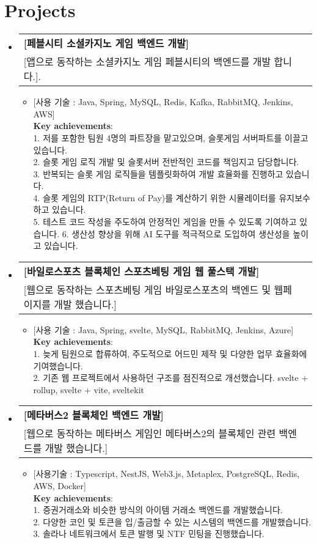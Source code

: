 \documentclass[letterpaper,11pt]{article}
\makeatletter
\newcommand{\resumeItem}[1]{
  \item\small{
    {#1 \vspace{-2pt}}
  }
}
\newcommand{\resumeProject}[2]{
  \vspace{-1pt}\item
    \begin{tabular*}{0.97\textwidth}[t]{l@{\extracolsep{\fill}}r}
      \textbf{#1} \\
      \small{#2} \\
    \end{tabular*}\vspace{-5pt}
}
\newcommand{\resumeSubHeadingListStart}{\begin{itemize}[leftmargin=*]}
\newcommand{\resumeSubHeadingListEnd}{\end{itemize}}
\newcommand{\resumeItemListStart}{\begin{itemize}}
\newcommand{\resumeItemListEnd}{\end{itemize}\vspace{-5pt}}
\makeatother
\begin{document}
\section{Projects}
  \resumeSubHeadingListStart
    \resumeProject
      {[페블시티 소셜카지노 게임 백엔드 개발]}
         {[앱으로 동작하는 소셜카지노 게임 페블시티의 백엔드를 개발 합니다.].}
         \resumeItemListStart
             \resumeItem{[사용 기술 : Java, Spring, MySQL, Redis, Kafka, RabbitMQ, Jenkins, AWS] \\
             \textbf{Key achievements}: \\ 
             1. 저를 포함한 팀원 4명의 파트장을 맡고있으며, 슬롯게임 서버파트를 이끌고 있습니다. \\
             2. 슬롯 게임 로직 개발 및 슬롯서버 전반적인 코드를 책임지고 담당합니다. \\
             3. 반복되는 슬롯 게임 로직들을 템플릿화하여 개발 효율화를 진행하고 있습니다. \\
             4. 슬롯 게임의 RTP(Return of Pay)를 계산하기 위한 시뮬레이터를 유지보수 하고 있습니다. \\
             5. 테스트 코드 작성을 주도하여 안정적인 게임을 만들 수 있도록 기여하고 있습니다.
             6. 생산성 향상을 위해 AI 도구를 적극적으로 도입하여 생산성을 높이고 있습니다. \\}
         \resumeItemListEnd
    
    \resumeProject
      {[바일로스포츠 블록체인 스포츠베팅 게임 웹 풀스택 개발]}
          {[웹으로 동작하는 스포츠베팅 게임 바일로스포츠의 백엔드 및 웹페이지를 개발 했습니다.]}
          \resumeItemListStart
            \resumeItem{[사용 기술 : Java, Spring, svelte, MySQL, RabbitMQ, Jenkins, Azure]} \\
            \textbf{Key achievements}: \\ 
                 1. 늦게 팀원으로 합류하여, 주도적으로 어드민 제작 및 다양한 업무 효율화에 기여했습니다. \\
                 2. 기존 웹 프로젝트에서 사용하던 구조를 점진적으로 개선했습니다.
                 svelte + rollup, svelte + vite, sveltekit \\
        \resumeItemListEnd

    \resumeProject
      {[메타버스2 블록체인 백엔드 개발]}
          {[웹으로 동작하는 메타버스 게임인 메타버스2의 블록체인 관련 백엔드를 개발 했습니다.]}
          \resumeItemListStart
            \resumeItem{[사용기술 : Typescript, NestJS, Web3.js, Metaplex, PostgreSQL, Redis, AWS, Docker]} \\
            \textbf{Key achievements}: \\ 
                 1. 증권거래소와 비슷한 방식의 아이템 거래소 백엔드를 개발했습니다. \\
                 2. 다양한 코인 및 토큰을 입/출금할 수 있는 시스템의 백엔드를 개발했습니다. \\
                 3. 솔라나 네트워크에서 토큰 발행 및 NTF 민팅을 진행했습니다.
        \resumeItemListEnd
  \resumeSubHeadingListEnd
\end{document}
